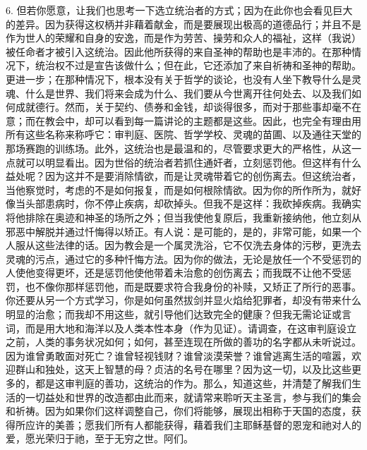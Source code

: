 6. 但若你愿意，让我们也思考一下选立统治者的方式；因为在此你也会看见巨大的差异。因为获得这权柄并非藉着献金，而是要展现出极高的道德品行；并且不是作为世人的荣耀和自身的安逸，而是作为劳苦、操劳和众人的福祉，这样（我说）被任命者才被引入这统治。因此他所获得的来自圣神的帮助也是丰沛的。在那种情况下，统治权不过是宣告该做什么；但在此，它还添加了来自祈祷和圣神的帮助。更进一步；在那种情况下，根本没有关于哲学的谈论，也没有人坐下教导什么是灵魂、什么是世界、我们将来会成为什么、我们要从今世离开往何处去、以及我们如何成就德行。然而，关于契约、债券和金钱，却谈得很多，而对于那些事却毫不在意；而在教会中，却可以看到每一篇讲论的主题都是这些。因此，也完全有理由用所有这些名称来称呼它：审判庭、医院、哲学学校、灵魂的苗圃、以及通往天堂的那场赛跑的训练场。此外，这统治也是最温和的，尽管要求更大的严格性，从这一点就可以明显看出。因为世俗的统治者若抓住通奸者，立刻惩罚他。但这样有什么益处呢？因为这并不是要消除情欲，而是让灵魂带着它的创伤离去。但这统治者，当他察觉时，考虑的不是如何报复，而是如何根除情欲。因为你的所作所为，就好像当头部患病时，你不停止疾病，却砍掉头。但我不是这样：我砍掉疾病。我确实将他排除在奥迹和神圣的场所之外；但当我使他复原后，我重新接纳他，他立刻从邪恶中解脱并通过忏悔得以矫正。有人说：是可能的，是的，非常可能，如果一个人服从这些法律的话。因为教会是一个属灵洗浴，它不仅洗去身体的污秽，更洗去灵魂的污点，通过它的多种忏悔方法。因为你的做法，无论是放任一个不受惩罚的人使他变得更坏，还是惩罚他使他带着未治愈的创伤离去；而我既不让他不受惩罚，也不像你那样惩罚他，而是既要求符合我身份的补赎，又矫正了所行的恶事。你还要从另一个方式学习，你是如何虽然拔剑并显火焰给犯罪者，却没有带来什么明显的治愈；而我却不用这些，就引导他们达致完全的健康？但我无需论证或言词，而是用大地和海洋以及人类本性本身（作为见证）。请调查，在这审判庭设立之前，人类的事务状况如何；如何，甚至连现在所做的善功的名字都从未听说过。因为谁曾勇敢面对死亡？谁曾轻视钱财？谁曾淡漠荣誉？谁曾逃离生活的喧嚣，欢迎群山和独处，这天上智慧的母？贞洁的名号在哪里？因为这一切，以及比这些更多的，都是这审判庭的善功，这统治的作为。那么，知道这些，并清楚了解我们生活的一切益处和世界的改造都由此而来，就请常来聆听天主圣言，参与我们的集会和祈祷。因为如果你们这样调整自己，你们将能够，展现出相称于天国的态度，获得所应许的美善；愿我们所有人都能获得，藉着我们主耶稣基督的恩宠和祂对人的爱，愿光荣归于祂，至于无穷之世。阿们。\par


